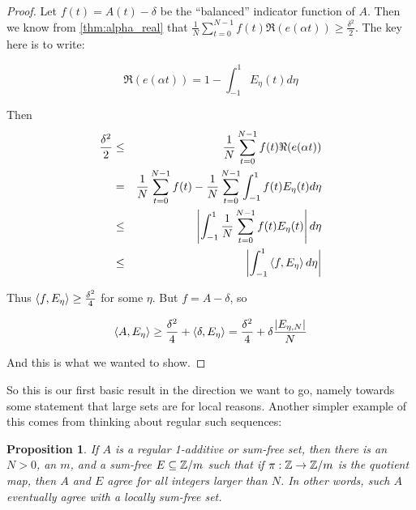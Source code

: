 \documentclass{report}
\newtheorem{proposition}[theorem]{Proposition}
\theoremstyle{remark}
\numberwithin{equation}{section}
\begin{document}
\begin{proof}
  Let $f(t) = A(t) - \delta$ be the ``balanced'' indicator function of
  $A$.  Then we know from \ref{thm:alpha_real} that $\frac{1}{N}\sum_{t=0}^{N-1}
  f(t)\Re(e(\alpha t)) \geq \frac{\delta^2}{2}$.  The key here is to
  write: 

  \[\Re(e(\alpha t)) = 1-\int_{-1}^1 E_\eta(t)d\eta\]

  Then 
  \begin{eqnarray*}
    \frac{\delta^2}{2} &\leq& \frac{1}{N}\sum_{t=0}^{N-1}
                              f(t)\Re(e(\alpha t)) \\
                       &=& \frac{1}{N}\sum_{t=0}^{N-1}
                           f(t) -  \frac{1}{N}\sum_{t=0}^{N-1}
                           \int_{-1}^1 f(t) E_\eta(t)d\eta\\
                       &\leq& \left|\int_{-1}^1 \frac{1}{N}\sum_{t=0}^{N-1} f(t) E_\eta(t)\right|d\eta\\
                       &\leq& \left|\int_{-1}^1 \left<f, E_\eta\right> d\eta\right|
\end{eqnarray*}

Thus $\left<f, E_\eta\right> \geq \frac{\delta^2}{4}$ for some $\eta$.  But
$f = A - \delta$, so 

\[\left<A, E_\eta\right> \geq \frac{\delta^2}{4} + \left<\delta, E_\eta\right> =
  \frac{\delta^2}{4} + \delta \frac{|E_{\eta,N}|}{N}\]

And this is what we wanted to show.
\end{proof}

So this is our first basic result in the direction we want to go,
namely towards some statement that large \relevant sets are \relevant
for local reasons.  Another simpler example of this comes from
thinking about regular such sequences:

\begin{proposition}\label{prop:regular_sumfree}
  If $A$ is a regular 1-additive or sum-free set, then there is an
  $N > 0$, an $m$, and a sum-free $E \subseteq \mathbb{Z}/m$ such that if
  $\pi : \mathbb{Z} \to \mathbb{Z}/m$ is the quotient map, then $A$ and $E$ agree for
  all integers larger than $N$.  In other words, such $A$ eventually
  agree with a locally sum-free set. 
\end{proposition}
\end{document}
